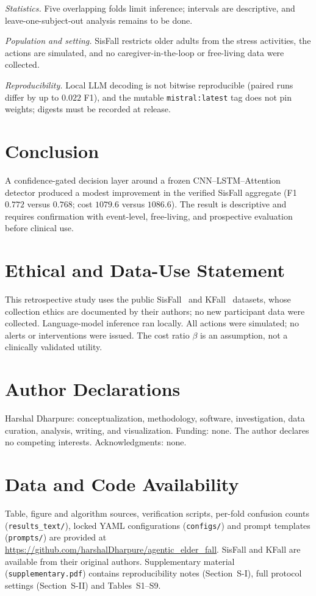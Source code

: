 \documentclass[journal]{IEEEtran}
\begin{document}
\emph{Statistics.} Five overlapping folds limit inference; intervals are descriptive, and leave-one-subject-out analysis remains to be done.

\emph{Population and setting.} SisFall restricts older adults from the stress activities, the actions are simulated, and no caregiver-in-the-loop or free-living data were collected.

\emph{Reproducibility.} Local LLM decoding is not bitwise reproducible (paired runs differ by up to $0.022$ F1), and the mutable \texttt{mistral:latest} tag does not pin weights; digests must be recorded at release.

\section{Conclusion}
\label{sec:concl}

A confidence-gated decision layer around a frozen CNN--LSTM--Attention detector
produced a modest improvement in the verified SisFall aggregate (F1 $0.772$
versus $0.768$; cost $1079.6$ versus $1086.6$). The result is descriptive and
requires confirmation with event-level, free-living, and prospective evaluation
before clinical use.

\section*{Ethical and Data-Use Statement}
This retrospective study uses the public SisFall~\cite{sisfall2017} and KFall~\cite{kfall2021} datasets, whose collection ethics are documented by their authors; no new participant data were collected. Language-model inference ran locally. All actions were simulated; no alerts or interventions were issued. The cost ratio $\beta$ is an assumption, not a clinically validated utility.

\section*{Author Declarations}
\label{sec:authordecls}
Harshal Dharpure: conceptualization, methodology, software, investigation, data curation, analysis, writing, and visualization. Funding: none. The author declares no competing interests. Acknowledgments: none.

\section*{Data and Code Availability}
Table, figure and algorithm sources, verification scripts, per-fold confusion counts (\texttt{results\_text/}), locked YAML configurations (\texttt{configs/}) and prompt templates (\texttt{prompts/}) are provided at \url{https://github.com/harshalDharpure/agentic_elder_fall}. SisFall and KFall are available from their original authors. Supplementary material (\texttt{supplementary.pdf}) contains reproducibility notes (Section~S-I), full protocol settings (Section~S-II) and Tables~S1--S9.




\end{document}
